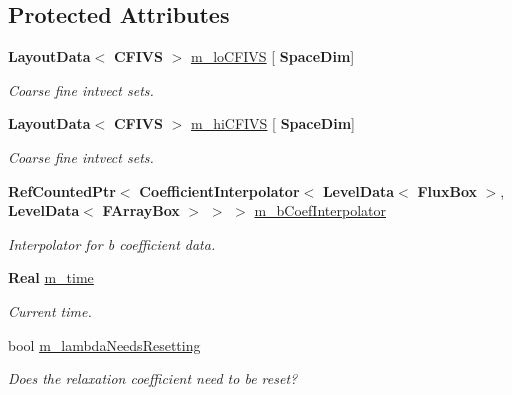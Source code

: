 \subsection*{Protected Attributes}
\begin{DoxyCompactItemize}
\item 
\mbox{\label{class_darcy_brinkman_op_a22e511a984f56a6ddfdf90dc6ec5ac0a}} 
\textbf{ Layout\+Data}$<$ \textbf{ C\+F\+I\+VS} $>$ \hyperlink{class_darcy_brinkman_op_a22e511a984f56a6ddfdf90dc6ec5ac0a}{m\+\_\+lo\+C\+F\+I\+VS} \mbox{[}\textbf{ Space\+Dim}\mbox{]}
\begin{DoxyCompactList}\small\item\em Coarse fine intvect sets. \end{DoxyCompactList}\item 
\mbox{\label{class_darcy_brinkman_op_a6177888421b0d13671e8a05a7c25a99a}} 
\textbf{ Layout\+Data}$<$ \textbf{ C\+F\+I\+VS} $>$ \hyperlink{class_darcy_brinkman_op_a6177888421b0d13671e8a05a7c25a99a}{m\+\_\+hi\+C\+F\+I\+VS} \mbox{[}\textbf{ Space\+Dim}\mbox{]}
\begin{DoxyCompactList}\small\item\em Coarse fine intvect sets. \end{DoxyCompactList}\item 
\mbox{\label{class_darcy_brinkman_op_ab867d6f04206f2212c8e458fc460551e}} 
\textbf{ Ref\+Counted\+Ptr}$<$ \textbf{ Coefficient\+Interpolator}$<$ \textbf{ Level\+Data}$<$ \textbf{ Flux\+Box} $>$, \textbf{ Level\+Data}$<$ \textbf{ F\+Array\+Box} $>$ $>$ $>$ \hyperlink{class_darcy_brinkman_op_ab867d6f04206f2212c8e458fc460551e}{m\+\_\+b\+Coef\+Interpolator}
\begin{DoxyCompactList}\small\item\em Interpolator for b coefficient data. \end{DoxyCompactList}\item 
\mbox{\label{class_darcy_brinkman_op_ae3bc28a06e580430b51aaf07db866117}} 
\textbf{ Real} \hyperlink{class_darcy_brinkman_op_ae3bc28a06e580430b51aaf07db866117}{m\+\_\+time}
\begin{DoxyCompactList}\small\item\em Current time. \end{DoxyCompactList}\item 
\mbox{\label{class_darcy_brinkman_op_a854d500d6bf64372c1249e8b0d919c8e}} 
bool \hyperlink{class_darcy_brinkman_op_a854d500d6bf64372c1249e8b0d919c8e}{m\+\_\+lambda\+Needs\+Resetting}
\begin{DoxyCompactList}\small\item\em Does the relaxation coefficient need to be reset? \end{DoxyCompactList}\end{DoxyCompactItemize}
